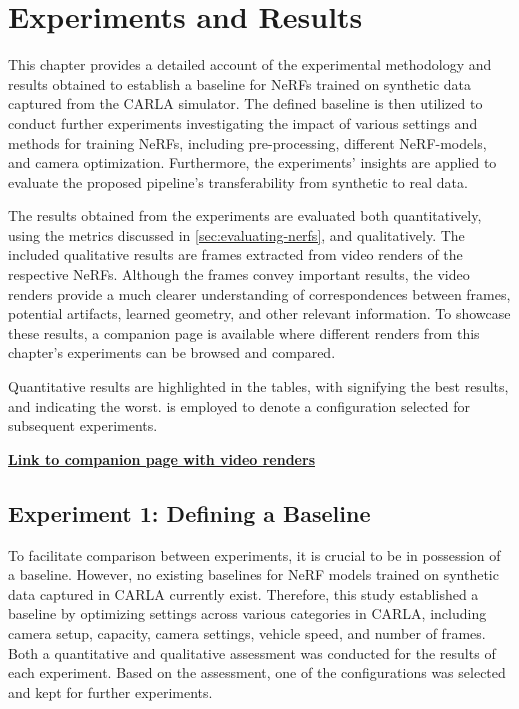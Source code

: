 \chapter{Experiments and Results} \label{sec:experiments-and-results}
This chapter provides a detailed account of the experimental methodology and results obtained to establish a baseline for NeRFs trained on synthetic data captured from the CARLA simulator. The defined baseline is then utilized to conduct further experiments investigating the impact of various settings and methods for training NeRFs, including pre-processing, different NeRF-models, and camera optimization. Furthermore, the experiments' insights are applied to evaluate the proposed pipeline's transferability from synthetic to real data.

The results obtained from the experiments are evaluated both quantitatively, using the metrics discussed in \autoref{sec:evaluating-nerfs}, and qualitatively. The included qualitative results are frames extracted from video renders of the respective NeRFs. Although the frames convey important results, the video renders provide a much clearer understanding of correspondences between frames, potential artifacts, learned geometry, and other relevant information. To showcase these results, a companion page is available where different renders from this chapter's experiments can be browsed and compared.

Quantitative results are highlighted in the tables, with  signifying the best results, and  indicating the worst.  is employed to denote a configuration selected for subsequent experiments.

\vspace{2mm} %
\noindent \textbf{\href{https://absorbing-peace-5f6.notion.site/NeRF-Renders-Master-thesis-34ff125e2200406588f002b36eeaacef}{Link to companion page with video renders}}


\newpage
\section{Experiment 1: Defining a Baseline}

To facilitate comparison between experiments, it is crucial to be in possession of a baseline. However, no existing baselines for NeRF models trained on synthetic data captured in CARLA currently exist. Therefore, this study established a baseline by optimizing settings across various categories in CARLA, including camera setup, capacity, camera settings, vehicle speed, and number of frames. Both a quantitative and qualitative assessment was conducted for the results of each experiment. Based on the assessment, one of the configurations was selected and kept for further experiments.

